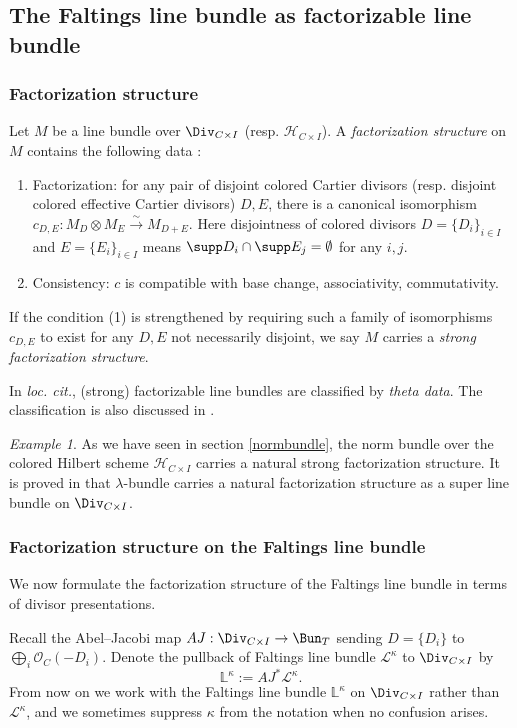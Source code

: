 \documentclass{amsart}
\numberwithin{equation}{section}
\numberwithin{figure}{section}
\theoremstyle{definition}
\theoremstyle{remark}
\newtheorem{ex}[thm]{Example}
\renewcommand{\c}[1]{\mathcal{#1}}
\renewcommand{\b}[1]{\mathbb{#1}}
\begin{document}
\subsection{The Faltings line bundle as factorizable line bundle}
\subsubsection{Factorization structure}
Let $M$ be a line bundle over $\Div_{C\times I}$ (resp. $\c H_{C\times I}$). A \emph{factorization structure} on $M$
contains the following data \cite[3.10.7]{beilinson2004chiral}:
\begin{enumerate}
\item Factorization: for any pair of disjoint colored Cartier divisors (resp. disjoint colored effective Cartier divisors)  $D,E$, there is a canonical isomorphism $c_{D,E}: M_{D}\otimes M_{E} \xrightarrow{\sim}  M_{D+E}$.
 Here disjointness of colored divisors $D=\{D_i\}_{i\in I}$ and $E=\{E_i\}_{i\in I}$ means $\supp D_i\cap \supp E_j=\emptyset$ for any $i,j$.
\item Consistency: $c$ is compatible with base change, associativity, commutativity. 
\end{enumerate}
If  the condition (1) is strengthened by requiring such a family of isomorphisms $c_{D,E}$ to exist for any $D,E$ not necessarily disjoint, we say $M$ carries a \textit{strong factorization structure}.

In \textit{loc. cit.}, (strong) factorizable line bundles are classified by \textit{theta data}. The classification is also discussed in \cite{tao2021central}.
\begin{ex}
As we have seen in section \ref{normbundle}, the norm bundle over the colored Hilbert scheme $\c H_{C\times I}$ carries a natural strong factorization structure. It is proved in \cite[3.10.7]{beilinson2004chiral} that $\lambda$-bundle carries a natural factorization structure as a super line bundle on $\Div_{C\times I}$.
\end{ex}
\subsubsection{Factorization structure on the Faltings line bundle}\label{faltingslocal}
We now formulate the factorization structure of the Faltings line bundle in terms of divisor presentations.

Recall the Abel--Jacobi map
$AJ:\Div_{C\times I}\to \Bun_T$ sending $
D=\{D_i\}$ to $\bigoplus_i\mathcal O_C(-D_i).$
Denote the pullback of Faltings line bundle $\c L^\kappa$ to $\Div_{C\times I}$ by $$\b L^\kappa := AJ^*\mathcal L^\kappa.$$
From now on we work with the Faltings line bundle $\b L^\kappa$ on $\Div_{C\times I}$ rather than $\c L^\kappa$, and we sometimes suppress $\kappa$ from the notation when no confusion arises.
\end{document}
